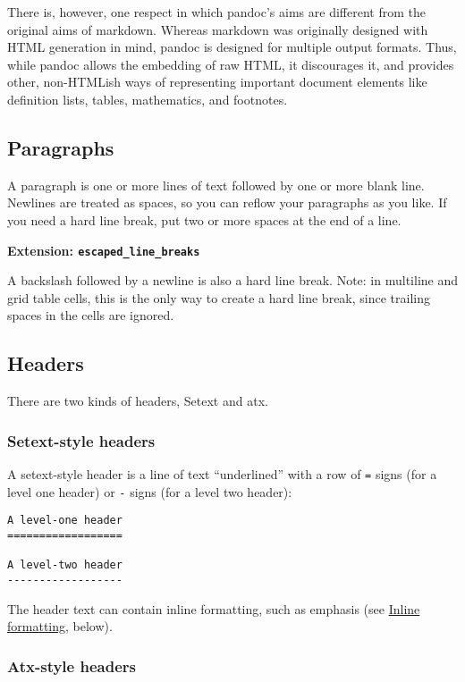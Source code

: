\documentclass[]{article}
\begin{document}
There is, however, one respect in which pandoc's aims are different from
the original aims of markdown. Whereas markdown was originally designed
with HTML generation in mind, pandoc is designed for multiple output
formats. Thus, while pandoc allows the embedding of raw HTML, it
discourages it, and provides other, non-HTMLish ways of representing
important document elements like definition lists, tables, mathematics,
and footnotes.

\subsection{Paragraphs}\label{paragraphs}

A paragraph is one or more lines of text followed by one or more blank
line. Newlines are treated as spaces, so you can reflow your paragraphs
as you like. If you need a hard line break, put two or more spaces at
the end of a line.

\textbf{Extension: \texttt{escaped\_line\_breaks}}

A backslash followed by a newline is also a hard line break. Note: in
multiline and grid table cells, this is the only way to create a hard
line break, since trailing spaces in the cells are ignored.

\subsection{Headers}\label{headers}

There are two kinds of headers, Setext and atx.

\subsubsection{Setext-style headers}\label{setext-style-headers}

A setext-style header is a line of text ``underlined'' with a row of
\texttt{=} signs (for a level one header) or \texttt{-} signs (for a
level two header):

\begin{verbatim}
A level-one header
==================

A level-two header
------------------
\end{verbatim}

The header text can contain inline formatting, such as emphasis (see
\hyperref[inline-formatting]{Inline formatting}, below).

\subsubsection{Atx-style headers}\label{atx-style-headers}
\end{document}
